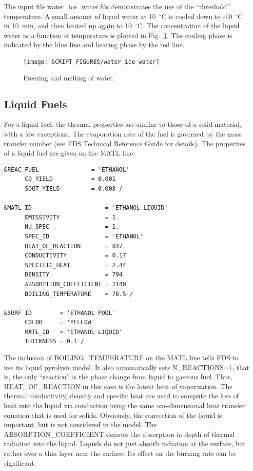 \documentclass[11pt]{book}
\begin{document}
The input file {\ct water\_ice\_water.fds} demonstrates the use of the ``threshold'' temperature. A small amount of liquid water at 10~$^\circ$C is cooled down to -10~$^\circ$C in 10~min, and then heated up again to 10~$^\circ$C. The concentration of the liquid water as a function of temperature is plotted in Fig.~\ref{water_ice_water_plot}. The cooling phase is indicated by the blue line and heating phase by the red line.

\begin{figure}[ht]
\begin{center}
\texttt{[image: SCRIPT\_FIGURES/water\_ice\_water]}
\end{center}
\caption[Results of the {\ct water\_ice\_water} test case]{Freezing and melting of water.}
\label{water_ice_water_plot}
\end{figure}




\subsection{Liquid Fuels}
\label{info:liquid_fuels}

For a liquid fuel, the thermal properties are similar to those of a solid material, with a few exceptions. The evaporation rate of the fuel is governed by the mass transfer number (see FDS Technical Reference Guide for details). The properties of a liquid fuel are given on the {\ct MATL} line:
\begin{lstlisting}
&REAC FUEL               = 'ETHANOL'
      CO_YIELD           = 0.001
      SOOT_YIELD         = 0.008 /

&MATL ID                     = 'ETHANOL LIQUID'
      EMISSIVITY             = 1.
      NU_SPEC                = 1.
      SPEC_ID                = 'ETHANOL'
      HEAT_OF_REACTION       = 837
      CONDUCTIVITY           = 0.17
      SPECIFIC_HEAT          = 2.44
      DENSITY                = 794
      ABSORPTION_COEFFICIENT = 1140
      BOILING_TEMPERATURE    = 78.5 /

&SURF ID        = 'ETHANOL POOL'
      COLOR     = 'YELLOW'
      MATL_ID   = 'ETHANOL LIQUID'
      THICKNESS = 0.1 /
\end{lstlisting}
The inclusion of {\ct BOILING\_TEMPERATURE} on the {\ct MATL} line tells FDS to use its liquid pyrolysis model. It also automatically sets {\ct N\_REACTIONS=1}, that is, the only ``reaction'' is the phase change from liquid to gaseous fuel. Thus, {\ct HEAT\_OF\_REACTION} in this case is the latent heat of vaporization. The thermal conductivity, density and specific heat are used to compute the loss of heat into the liquid via conduction using the same one-dimensional heat transfer equation that is used for solids. Obviously, the convection of the liquid is important, but is not considered in the model. The {\ct ABSORPTION\_COEFFICIENT} denotes the absorption in depth of thermal radiation into the liquid. Liquids do not just absorb radiation at the surface, but rather over a thin layer near the surface. Its effect on the burning rate can be significant.
\end{document}
